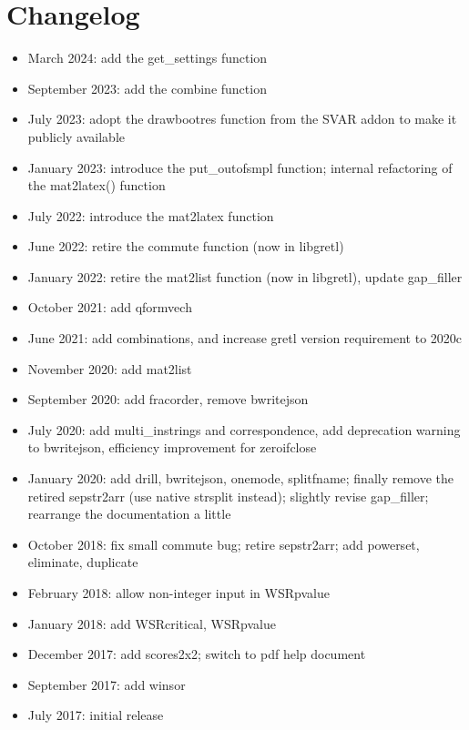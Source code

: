 \documentclass[11pt,english]{article}
\begin{document}
\section{Changelog }
\begin{itemize}
\item March 2024: add the get\_settings function
\item September 2023: add the combine function
\item July 2023: adopt the drawbootres function from the SVAR addon
  to make it publicly available
\item January 2023: introduce the put\_outofsmpl function; internal
  refactoring of the mat2latex() function
\item July 2022: introduce the mat2latex function
\item June 2022: retire the commute function (now in libgretl)
\item January 2022: retire the mat2list function (now in
  libgretl), update gap\_filler
\item October 2021: add qformvech
\item June 2021: add combinations, and increase gretl version requirement
  to 2020c
\item November 2020: add mat2list
\item September 2020: add fracorder, remove bwritejson
\item July 2020: add multi\_instrings and correspondence, add deprecation
  warning to bwritejson, efficiency improvement for zeroifclose
\item January 2020: add drill, bwritejson, onemode, splitfname;
  finally remove the retired sepstr2arr (use native strsplit instead);
  slightly revise gap\_filler; rearrange the documentation a little
\item October 2018: fix small commute bug; retire sepstr2arr; add
  powerset, eliminate, duplicate
\item February 2018: allow non-integer input in WSRpvalue
\item January 2018: add WSRcritical, WSRpvalue
\item December 2017: add scores2x2; switch to pdf help document
\item September 2017: add winsor
\item July 2017: initial release
\end{itemize}
\end{document}
